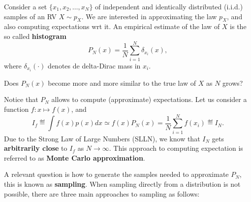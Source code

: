 Consider a set $\{x_1,x_2,\ldots,x_N\}$ of independent and identically distributed (i.i.d.) samples of an RV $X\sim p_X$. We are interested in approximating the law $p_X$, and also computing expectations wrt it. An empirical estimate of the law of $X$ is the so called \textbf{histogram}
\begin{equation}
	P_N(x) = \frac{1}{N} \sum_{i=1}^N \delta_{x_i}(x),
\end{equation}
where $\delta_{x_i}(\cdot)$ denotes de delta-Dirac mass in $x_i$. 

\begin{mdframed}[style=discusion, frametitle={\center Real approximation?}]

Does $P_N(x)$ become more and more similar to the true law of $X$ as $N$ grows? 

\end{mdframed}

Notice that $P_N$ allows to compute (approximate) expectations. Let us consider a function $f: x \mapsto f(x)$, and 
\begin{equation}
	I_f \eqdef  \int f(x)p(x)dx \simeq f(x)P_N(x) = \frac{1}{N} \sum_{i=1}^{N} f(x_i) \eqdef I_N. 
\end{equation}
Due to the Strong Law of Large Numbers (SLLN), we know that $I_N$ gets \textbf{arbitrarily close} to $I_f$ as $N\to\infty$. This approach to computing expectation is referred to as \textbf{Monte Carlo approximation}.

A relevant question is how to generate the samples needed to approximate $P_N$, this is known as \textbf{sampling}. When sampling directly from a distribution is not possible, there are three main approaches to sampling as follows:

